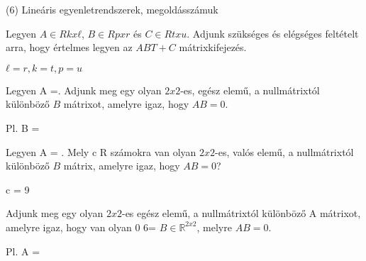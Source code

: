 \begin{frame}[plain]
\begin{tcolorbox}[center, colback={myyellow}, coltext={black}, colframe={myyellow}]
    {\RHuge  (6) Lineáris egyenletrendszerek, megoldásszámuk}
    \mmedskip
\end{tcolorbox}
\end{frame}

\begin{frame}
  \begin{tcolorbox}[title={6/1. -N-}]
    Legyen $A \in Rkxℓ$, $B \in Rpxr$ és $C \in Rtxu$. Adjunk szükséges és elégséges feltételt arra, hogy értelmes legyen az $ABT + C$ mátrixkifejezés.
  \tcblower

    \mmedskip 
    
    $ℓ = r, k = t, p = u$
  \end{tcolorbox}
\end{frame}


\begin{frame}
  \begin{tcolorbox}[title={6/2. -N-}]
    Legyen A =. Adjunk meg egy olyan $2x2$-es, egész elemű, a nullmátrixtól különböző $B$ mátrixot, amelyre igaz, hogy $AB = 0$.

  \tcblower

    \mmedskip 
    
    Pl. B =
  \end{tcolorbox}
\end{frame}


\begin{frame}
  \begin{tcolorbox}[title={6/3. -N-}]
     Legyen A = . Mely c \in R számokra van olyan $2x2$-es, valós elemű, a nullmátrixtól különböző $B$ mátrix, amelyre igaz, hogy $AB = 0$?
  \tcblower

    \mmedskip 
    
    c = 9
  \end{tcolorbox}
\end{frame}


\begin{frame}
  \begin{tcolorbox}[title={6/4. -N-}]
     Adjunk meg egy olyan $2x2$-es egész elemű, a nullmátrixtól különböző A mátrixot, amelyre igaz, hogy van olyan 0 6= $B \in \mathbb{R}^{2 x 2}$, melyre $AB = 0$.
  \tcblower

    \mmedskip 
    
    Pl. A =
  \end{tcolorbox}
\end{frame}


